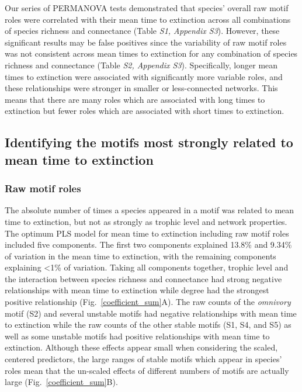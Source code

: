 \documentclass[12pt]{article}
\begin{document}
\begin{spacing}{2.0}
		Our series of PERMANOVA tests demonstrated that species' overall raw motif roles were correlated with their mean time to extinction across all combinations of species richness and connectance (Table \emph{S1, Appendix S3}). 
		However, these significant results may be false positives since the variability of raw motif roles was not consistent across mean times to extinction for any combination of species richness and connectance (Table \emph{S2, Appendix S3}). 
		Specifically, longer mean times to extinction were associated with significantly more variable roles, and these relationships were stronger in smaller or less-connected networks. 
		This means that there are many roles which are associated with long times to extinction but fewer roles which are associated with short times to extinction.
		
    

	\subsection*{Identifying the motifs most strongly related to mean time to extinction}

        \subsubsection*{Raw motif roles}
        
            The absolute number of times a species appeared in a motif was related to mean time to extinction, but not as strongly as trophic level and network properties.
            The optimum PLS model for mean time to extinction including raw motif roles included five components.
            The first two components explained 13.8\% and 9.34\% of variation in the mean time to extinction, with the remaining components explaining \textless1\% of variation.
            Taking all components together, trophic level and the interaction between species richness and connectance had strong negative relationships with mean time to extinction while degree had the strongest positive relationship (Fig.~\ref{coefficient_sum}A).
            The raw counts of the \emph{omnivory} motif (S2) and several unstable motifs had negative relationships with mean time to extinction while
            the raw counts of the other stable motifs (S1, S4, and S5) as well as some unstable motifs had positive relationships with mean time to extinction.
            Although these effects appear small when considering the scaled, centered predictors, the large ranges of stable motifs which appear in species' roles mean that the un-scaled effects of different numbers of motifs are actually large (Fig.~\ref{coefficient_sum}B).
                

\end{spacing}
\end{document}
